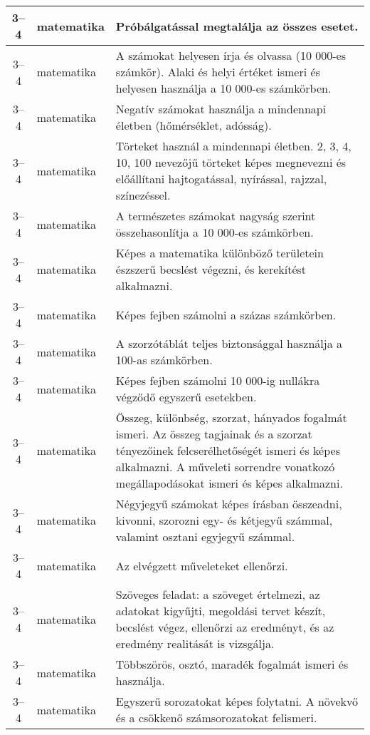 \begin{small}
\begin{longtable}{c | p{2cm} |  p{11cm} }
              3--4 & matematika & Próbálgatással megtalálja az összes esetet. \\ \hline
              3--4 & matematika & A számokat helyesen írja és olvassa (10 000-es számkör). Alaki és helyi értéket ismeri és helyesen használja a 10 000-es számkörben. \\ \hline
              3--4 & matematika & Negatív számokat használja a mindennapi életben (hőmérséklet, adósság). \\ \hline
              3--4 & matematika & Törteket használ a mindennapi életben. 2, 3, 4, 10, 100 nevezőjű törteket képes megnevezni és előállítani hajtogatással, nyírással, rajzzal, színezéssel. \\ \hline
              3--4 & matematika & A természetes számokat nagyság szerint összehasonlítja a 10 000-es számkörben. \\ \hline
              3--4 & matematika & Képes a matematika különböző területein észszerű becslést végezni, és kerekítést alkalmazni. \\ \hline
              3--4 & matematika & Képes fejben számolni a százas számkörben. \\ \hline
              3--4 & matematika & A szorzótáblát teljes biztonsággal használja a 100-as számkörben. \\ \hline
              3--4 & matematika & Képes fejben számolni 10 000-ig nullákra végződő egyszerű esetekben. \\ \hline
              3--4 & matematika & Összeg, különbség, szorzat, hányados fogalmát ismeri. Az összeg tagjainak és a szorzat tényezőinek felcserélhetőségét ismeri és képes alkalmazni. A műveleti sorrendre vonatkozó megállapodásokat ismeri és képes alkalmazni. \\ \hline
              3--4 & matematika & Négyjegyű számokat képes írásban összeadni, kivonni, szorozni egy- és kétjegyű számmal, valamint osztani egyjegyű számmal. \\ \hline
              3--4 & matematika & Az elvégzett műveleteket ellenőrzi. \\ \hline
              3--4 & matematika & Szöveges feladat: a szöveget értelmezi, az adatokat kigyűjti, megoldási tervet készít, becslést végez, ellenőrzi az eredményt, és az eredmény realitását is vizsgálja. \\ \hline
              3--4 & matematika & Többszörös, osztó, maradék fogalmát ismeri és használja. \\ \hline
              3--4 & matematika & Egyszerű sorozatokat képes folytatni. A növekvő és a csökkenő számsorozatokat felismeri. \\ \hline

\end{longtable}
\end{small}
